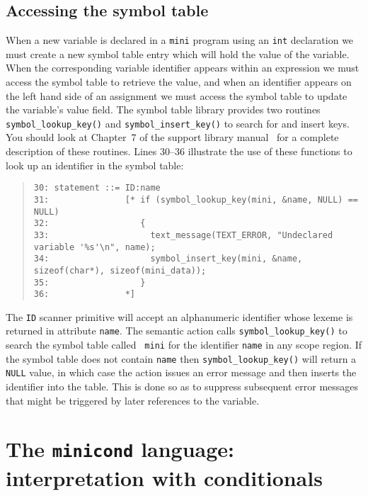 \section{Accessing the symbol table} When a new variable is declared
in a {\tt mini} program using an {\tt int} declaration we must create a new symbol
table entry which will hold the value of the variable. When the
corresponding variable  identifier appears within an expression we must
access the symbol table to retrieve the value, and when an identifier
appears on the left hand side of an assignment we must access the symbol
table to update the variable's value field. The symbol table library
provides two routines \verb+symbol_lookup_key()+ and
\verb+symbol_insert_key()+ to search for and insert keys. You should
look at Chapter~7 of the support library manual~\cite{rdp:supp:1.5}
for a complete description of these routines. Lines 30--36 illustrate the use of
these functions to look up an identifier in the symbol table:
\begin{quote}
{\footnotesize
\begin{verbatim}
30: statement ::= ID:name
31:               [* if (symbol_lookup_key(mini, &name, NULL) == NULL)
32:                  {
33:                    text_message(TEXT_ERROR, "Undeclared variable '%s'\n", name);
34:                    symbol_insert_key(mini, &name, sizeof(char*), sizeof(mini_data));
35:                  }
36:               *]
\end{verbatim}
}
\end{quote}
The {\tt ID} scanner primitive will accept an alphanumeric identifier
whose lexeme is returned in attribute {\tt name}. The semantic action
calls \verb+symbol_lookup_key()+ to search the symbol table called {\tt
mini} for the identifier {\tt name} in any scope region. If the symbol
table does not contain {\tt name} then \verb+symbol_lookup_key()+ will
return a {\tt NULL} value, in which case the action issues an error
message and then inserts the identifier into the table. This is done so
as to suppress subsequent error messages  that might be triggered by
later references to the variable.

\chapter{The {\tt minicond} language: interpretation with conditionals}

